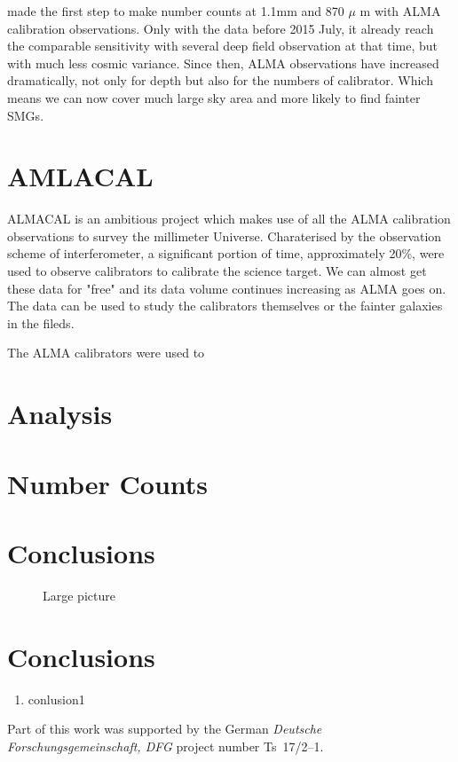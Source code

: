 \documentclass{ref/aa}
\begin{document}
\cite{Oteo2016a} made the first step to make number counts at 1.1mm and 870 $\mu$ m with ALMA calibration observations. 
Only with the data before 2015 July, it already reach the comparable sensitivity with several deep field observation at that time, but with much less cosmic variance.
Since then, ALMA observations have increased dramatically, not only for depth but also for the numbers of calibrator. 
Which means we can now cover much large sky area and more likely to find fainter SMGs. 


\section{AMLACAL}
ALMACAL is an ambitious project which makes use of all the ALMA calibration observations to survey the millimeter Universe.
Charaterised by the observation scheme of interferometer, a significant portion of time, approximately 20\%, were used to observe calibrators to calibrate the science target.
We can almost get these data for "free" and its data volume continues increasing as ALMA goes on.
The data can be used to study the calibrators themselves or the fainter galaxies in the fileds.

The ALMA calibrators were used to 


\section{Analysis}
\section{Number Counts}
\section{Conclusions}
   \begin{figure*}
   \centering
   \caption{Large picture}%
    \end{figure*}
%

\section{Conclusions}

   \begin{enumerate}
      \item conlusion1
   \end{enumerate}

\begin{acknowledgements}
      Part of this work was supported by the German
      \emph{Deut\-sche For\-schungs\-ge\-mein\-schaft, DFG\/} project
      number Ts~17/2--1.
\end{acknowledgements}




%
\end{document}
